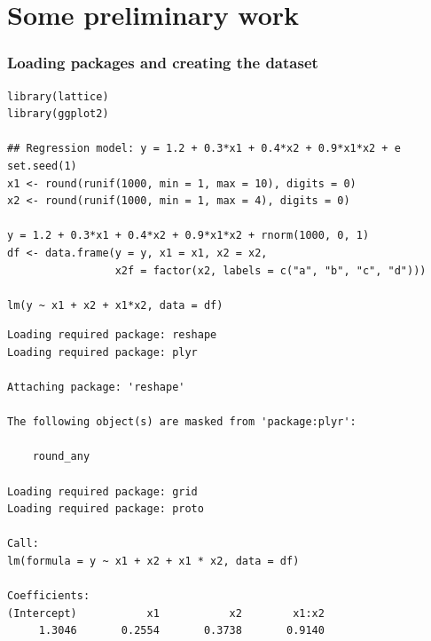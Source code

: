 \documentclass[bigger]{beamer}
\begin{document}
\section{Some preliminary work}
\label{sec-1}
\begin{frame}[fragile,shrink = 10]
\frametitle{Loading packages and creating the dataset}
\label{sec-1_1}

\lstset{language=R}
\begin{lstlisting}
library(lattice)
library(ggplot2)

## Regression model: y = 1.2 + 0.3*x1 + 0.4*x2 + 0.9*x1*x2 + e
set.seed(1)
x1 <- round(runif(1000, min = 1, max = 10), digits = 0)
x2 <- round(runif(1000, min = 1, max = 4), digits = 0)

y = 1.2 + 0.3*x1 + 0.4*x2 + 0.9*x1*x2 + rnorm(1000, 0, 1)
df <- data.frame(y = y, x1 = x1, x2 = x2, 
                 x2f = factor(x2, labels = c("a", "b", "c", "d")))

lm(y ~ x1 + x2 + x1*x2, data = df)
\end{lstlisting}




\begin{lstlisting}
Loading required package: reshape
Loading required package: plyr

Attaching package: 'reshape'

The following object(s) are masked from 'package:plyr':

    round_any

Loading required package: grid
Loading required package: proto
 
Call:
lm(formula = y ~ x1 + x2 + x1 * x2, data = df)

Coefficients:
(Intercept)           x1           x2        x1:x2  
     1.3046       0.2554       0.3738       0.9140
\end{lstlisting}
\end{frame}
\end{document}
